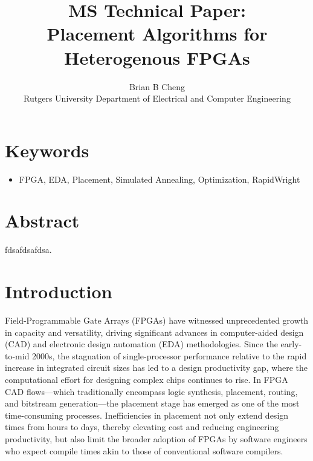 \documentclass[twocolumn]{article}
\begin{document}
\title{MS Technical Paper: \\ Placement Algorithms for Heterogenous FPGAs}
\author{Brian B Cheng \\ Rutgers University Department of Electrical and Computer Engineering}


\date{}
\maketitle

\section{Keywords}
\begin{itemize}
    \item FPGA, EDA, Placement, Simulated Annealing, Optimization, RapidWright
\end{itemize}


\section{Abstract}
    fdsafdsafdsa.

\section{Introduction}

    Field-Programmable Gate Arrays (FPGAs) have witnessed unprecedented growth in capacity and versatility, driving significant advances in computer-aided design (CAD) and electronic design automation (EDA) methodologies. 
    Since the early-to-mid 2000s, the stagnation of single-processor performance relative to the rapid increase in integrated circuit sizes has led to a design productivity gap, where the computational effort for designing complex chips continues to rise. 
    In FPGA CAD flows—which traditionally encompass logic synthesis, placement, routing, and bitstream generation—the placement stage has emerged as one of the most time-consuming processes. 
    Inefficiencies in placement not only extend design times from hours to days, thereby elevating cost and reducing engineering productivity, but also limit the broader adoption of FPGAs by software engineers who expect compile times akin to those of conventional software compilers. 
\end{document}
